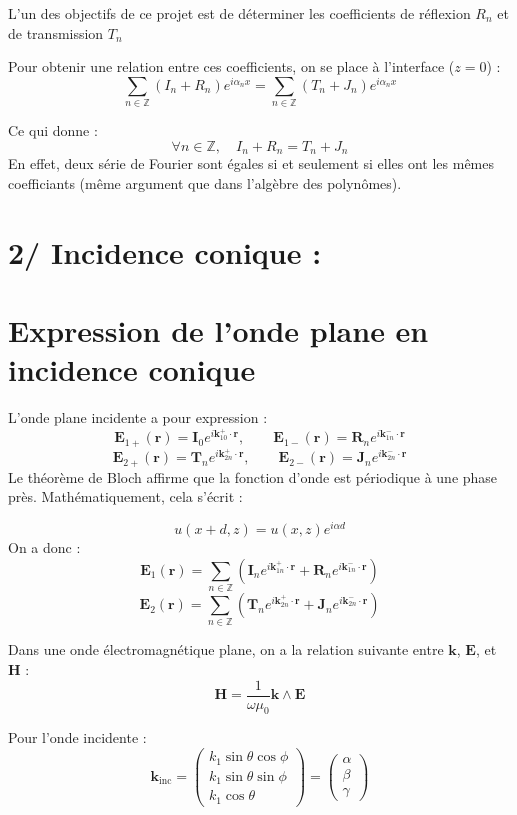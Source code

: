 \documentclass{article}
\begin{document}
\medskip

L’un des objectifs de ce projet est de déterminer les coefficients de réflexion \( R_n \) et de transmission \( T_n \)

Pour obtenir une relation entre ces coefficients, on se place à l'interface ($z = 0$) :
\[
\sum_{n \in \mathbb{Z}} \left( I_n + R_n \right) e^{i \alpha_n x}
=
\sum_{n \in \mathbb{Z}} \left( T_n + J_n \right) e^{i \alpha_n x}
\]

Ce qui donne :
\[
\forall n \in \mathbb{Z}, \quad I_n + R_n = T_n + J_n
\]
En effet, deux série de Fourier sont égales si et seulement si elles ont les mêmes coefficiants (même argument que dans l'algèbre des polynômes).
\section*{2/ Incidence conique :}
\section*{Expression de l’onde plane en incidence conique}

L’onde plane incidente a pour expression :
\[
\mathbf{E}_{1+}(\mathbf{r}) = \mathbf{I}_0 e^{i \mathbf{k}_{10}^{+} \cdot \mathbf{r}}, \qquad
\mathbf{E}_{1-}(\mathbf{r}) = \mathbf{R}_n e^{i \mathbf{k}_{1n}^{-} \cdot \mathbf{r}}
\]
\[
\mathbf{E}_{2+}(\mathbf{r}) = \mathbf{T}_n e^{i \mathbf{k}_{2n}^{+} \cdot \mathbf{r}}, \qquad
\mathbf{E}_{2-}(\mathbf{r}) = \mathbf{J}_n e^{i \mathbf{k}_{2n}^{-} \cdot \mathbf{r}}
\]
Le théorème de Bloch affirme que la fonction d'onde est périodique à une phase près. Mathématiquement, cela s’écrit :

\[
u(x + d, z) = u(x, z) e^{i \alpha d}
\]
On a donc :
\[
\mathbf{E}_1(\mathbf{r}) = \sum_{n \in \mathbb{Z}} \left( \mathbf{I}_n e^{i \mathbf{k}_{1n}^{+} \cdot \mathbf{r}} + \mathbf{R}_n e^{i \mathbf{k}_{1n}^{-} \cdot \mathbf{r}} \right)
\]
\[
\mathbf{E}_2(\mathbf{r}) = \sum_{n \in \mathbb{Z}} \left( \mathbf{T}_n e^{i \mathbf{k}_{2n}^{+} \cdot \mathbf{r}} + \mathbf{J}_n e^{i \mathbf{k}_{2n}^{-} \cdot \mathbf{r}} \right)
\]

Dans une onde électromagnétique plane, on a la relation suivante entre $\mathbf{k}$, $\mathbf{E}$, et $\mathbf{H}$ :
\[
\mathbf{H} = \frac{1}{\omega \mu_0} \mathbf{k} \wedge \mathbf{E}
\]

\medskip

Pour l’onde incidente :
\[
\mathbf{k}_{\text{inc}} = 
\begin{pmatrix}
k_1 \sin\theta \cos\phi \\
k_1 \sin\theta \sin\phi \\
k_1 \cos\theta
\end{pmatrix}
=
\begin{pmatrix}
\alpha \\
\beta \\
\gamma
\end{pmatrix}
\]
\end{document}
